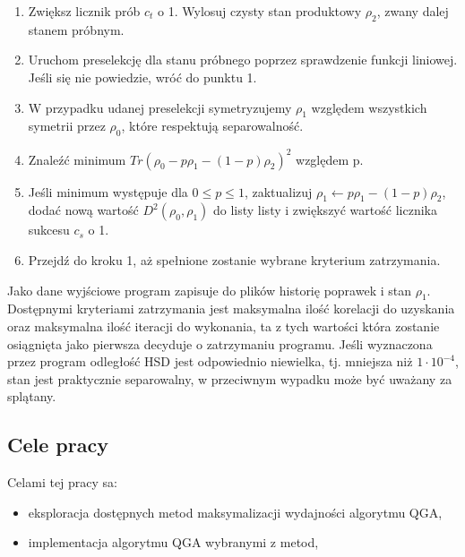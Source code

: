 \documentclass[11pt, a4paper]{article}
\begin{document}
\begin{sloppypar}
    \begin{enumerate}
      \item Zwiększ licznik prób $c_{t}$ o 1. Wylosuj czysty stan produktowy $\rho_{2}$,
        zwany dalej stanem próbnym.

      \item Uruchom preselekcję dla stanu próbnego poprzez sprawdzenie funkcji liniowej.
        Jeśli się nie powiedzie, wróć do punktu 1.

      \item W przypadku udanej preselekcji symetryzujemy $\rho_{1}$ względem wszystkich symetrii
        przez $\rho_{0}$, które respektują separowalność.

      \item Znaleźć minimum $Tr(\rho_{0}- p\rho_{1}- (1 - p)\rho_{2})^{2}$ względem p.

      \item Jeśli minimum występuje dla $0 \le p \le 1$, zaktualizuj
        $\rho_{1}\leftarrow p\rho_{1}- (1 - p)\rho_{2}$, dodać nową wartość $D^{2}(\rho_{0}
        , \rho_{1})$ do listy listy i zwiększyć wartość licznika sukcesu $c_{s}$ o 1.

      \item Przejdź do kroku 1, aż spełnione zostanie wybrane kryterium zatrzymania.
    \end{enumerate}

    Jako dane wyjściowe program zapisuje do plików historię poprawek i stan $\rho_{1}$. Dostępnymi
    kryteriami zatrzymania jest maksymalna ilość korelacji do uzyskania oraz maksymalna ilość
    iteracji do wykonania, ta z tych wartości która zostanie osiągnięta jako pierwsza
    decyduje o zatrzymaniu programu. Jeśli wyznaczona przez program odległość HSD jest odpowiednio
    niewielka, tj. mniejsza niż $1 \cdot 10^{-4}$, stan jest praktycznie separowalny, w przeciwnym
    wypadku może być uważany za splątany.

    \subsection{Cele pracy}
    Celami tej pracy sa:

    \begin{itemize}
      \item eksploracja dostępnych metod maksymalizacji wydajności algorytmu QGA,

      \item implementacja algorytmu QGA wybranymi z metod,


\end{itemize}
\end{sloppypar}
\end{document}

